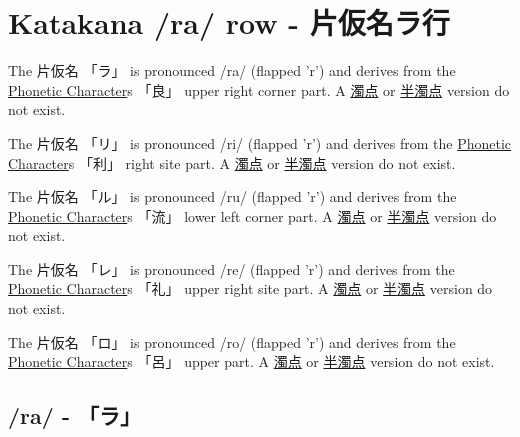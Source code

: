 \section{Katakana /ra/ row - 片仮名ラ行}\label{sec:KatakanaRaRow}


 The  片仮名 {「ラ」} is pronounced  /ra/ (flapped 'r')  and  derives from the
\hyperref[sec:PhoneticCharacter]{Phonetic Character}s {「良」} upper right corner part.
A \hyperref[sec:Dakuten]{濁点}  or \hyperref[sec:Handakuten]{半濁点} version  do not exist.


 The  片仮名 {「リ」} is pronounced  /ri/ (flapped 'r')  and  derives from the
\hyperref[sec:PhoneticCharacter]{Phonetic Character}s {「利」}  right site part.
A \hyperref[sec:Dakuten]{濁点}  or \hyperref[sec:Handakuten]{半濁点} version  do not exist.



 The  片仮名 {「ル」} is pronounced  /ru/ (flapped 'r')  and  derives from the
\hyperref[sec:PhoneticCharacter]{Phonetic Character}s {「流」} lower left corner part.
A \hyperref[sec:Dakuten]{濁点}  or \hyperref[sec:Handakuten]{半濁点} version  do not exist.


 The  片仮名 {「レ」} is pronounced  /re/ (flapped 'r')  and  derives from the
\hyperref[sec:PhoneticCharacter]{Phonetic Character}s {「礼」} upper right site part.
A \hyperref[sec:Dakuten]{濁点}  or \hyperref[sec:Handakuten]{半濁点} version  do not exist.

 The  片仮名 {「ロ」} is pronounced  /ro/ (flapped 'r')  and  derives from the
\hyperref[sec:PhoneticCharacter]{Phonetic Character}s {「呂」} upper part.
A \hyperref[sec:Dakuten]{濁点}  or \hyperref[sec:Handakuten]{半濁点} version  do not exist.



\newpage

\subsection{/ra/ - 「ラ」} \label{sec:KatakanaRa}

